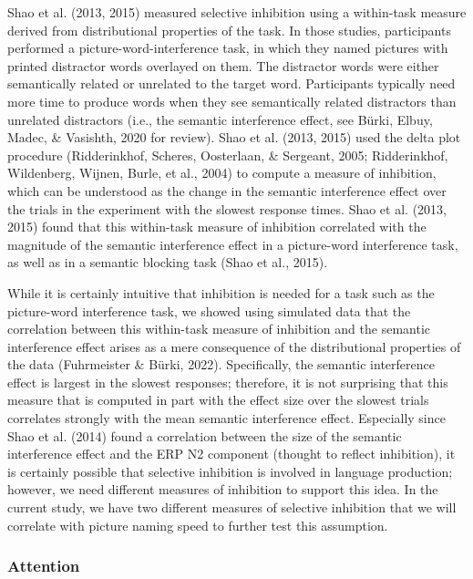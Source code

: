 \documentclass[
  man,floatsintext]{apa6}
\begin{document}
Shao et al. (2013, 2015) measured selective inhibition using a within-task measure derived from distributional properties of the task. In those studies, participants performed a picture-word-interference task, in which they named pictures with printed distractor words overlayed on them. The distractor words were either semantically related or unrelated to the target word. Participants typically need more time to produce words when they see semantically related distractors than unrelated distractors (i.e., the semantic interference effect, see Bürki, Elbuy, Madec, \& Vasishth, 2020 for review). Shao et al. (2013, 2015) used the delta plot procedure (Ridderinkhof, Scheres, Oosterlaan, \& Sergeant, 2005; Ridderinkhof, Wildenberg, Wijnen, Burle, et al., 2004) to compute a measure of inhibition, which can be understood as the change in the semantic interference effect over the trials in the experiment with the slowest response times. Shao et al. (2013, 2015) found that this within-task measure of inhibition correlated with the magnitude of the semantic interference effect in a picture-word interference task, as well as in a semantic blocking task (Shao et al., 2015).

While it is certainly intuitive that inhibition is needed for a task such as the picture-word interference task, we showed using simulated data that the correlation between this within-task measure of inhibition and the semantic interference effect arises as a mere consequence of the distributional properties of the data (Fuhrmeister \& Bürki, 2022). Specifically, the semantic interference effect is largest in the slowest responses; therefore, it is not surprising that this measure that is computed in part with the effect size over the slowest trials correlates strongly with the mean semantic interference effect. Especially since Shao et al. (2014) found a correlation between the size of the semantic interference effect and the ERP N2 component (thought to reflect inhibition), it is certainly possible that selective inhibition is involved in language production; however, we need different measures of inhibition to support this idea. In the current study, we have two different measures of selective inhibition that we will correlate with picture naming speed to further test this assumption.

\hypertarget{attention}{%
\subsubsection{Attention}\label{attention}}
\end{document}
